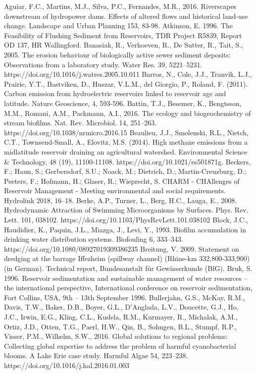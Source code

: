 \begin{thebibliography}{}
Aguiar, F.C., Martins, M.J., Silva, P.C., Fernandes, M.R., 2016. Riverscapes downstream of hydropower dams. Effects of altered flows and historical land-use change. Landscape and Urban Planning 153, 83-98.
Atkinson, E. 1996. The Feasibility of Flushing Sediment from Reservoirs, TDR Project R5839, Report OD 137, HR Wallingford.
Banasiak, R., Verhoeven, R., De Sutter, R., Tait, S., 2005. The erosion behaviour of biologically active sewer sediment deposits: Observations from a laboratory study. Water Res. 39, 5221–5231. https://doi.org/10.1016/j.watres.2005.10.011
Barros, N., Cole, J.J., Tranvik, L.J., Prairie, Y.T., Bastviken, D., Huszar, V.L.M., del Giorgio, P., Roland, F. (2011). Carbon emission from hydroelectric reservoirs linked to reservoir age and latitude. Nature Geoscience, 4, 593-596.
Battin, T.J., Besemer, K., Bengtsson, M.M., Romani, A.M., Packmann, A.I., 2016. The ecology and biogeochemistry of stream biofilms. Nat. Rev. Microbiol. 14, 251–263. https://doi.org/10.1038/nrmicro.2016.15
Beaulieu, J.J., Smolenski, R.L., Nietch, C.T., Townsend-Small, A., Elovitz, M.S. (2014). High methane emissions from a midlatitude reservoir draining an agricultural watershed. Environmental Science & Technology, 48 (19), 11100-11108. https://doi.org/10.1021/es501871g.
Beckers, F.; Haun, S.; Gerbersdorf, S.U.; Noack, M.; Dietrich, D.; Martin-Creuzburg, D.; Peeters, F.; Hofmann, H.; Glaser, R.; Wieprecht, S. CHARM - CHAllenges of Reservoir Management - Meeting environmental and social requirements. Hydrolink 2018, 16–18.
Berke, A.P., Turner, L., Berg, H.C., Lauga, E., 2008. Hydrodynamic Attraction of Swimming Microorganisms by Surfaces. Phys. Rev. Lett. 101, 038102. https://doi.org/10.1103/PhysRevLett.101.038102
Block, J.C., Haudidier, K., Paquin, J.L., Miazga, J., Levi, Y., 1993. Biofilm accumulation in drinking water distribution systems. Biofouling 6, 333–343. https://doi.org/10.1080/08927019309386235
Breitung, V. 2009. Statement on dredging at the barrage Iffezheim (spillway channel) (Rhine-km 332,800-333,900) (in German). Technical report, Bundesanstalt für Gewässerkunde (BfG).
Bruk, S. 1996. Reservoir sedimentation and sustainable management of water resources – the international perspective, International conference on reservoir sedimentation, Fort Collins, USA, 9th – 13th September 1996.
Bullerjahn, G.S., McKay, R.M., Davis, T.W., Baker, D.B., Boyer, G.L., D’Anglada, L.V., Doucette, G.J., Ho, J.C., Irwin, E.G., Kling, C.L., Kudela, R.M., Kurmayer, R., Michalak, A.M., Ortiz, J.D., Otten, T.G., Paerl, H.W., Qin, B., Sohngen, B.L., Stumpf, R.P., Visser, P.M., Wilhelm, S.W., 2016. Global solutions to regional problems: Collecting global expertise to address the problem of harmful cyanobacterial blooms. A Lake Erie case study. Harmful Algae 54, 223–238. https://doi.org/10.1016/j.hal.2016.01.003

\end{thebibliography}
